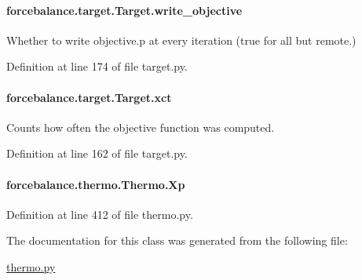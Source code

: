 \hypertarget{classforcebalance_1_1target_1_1Target_a7a95624dfe03f0cee0e5f1ae09db306a}{
\paragraph[{write\-\_\-objective}]{\setlength{\rightskip}{0pt plus 5cm}forcebalance.\-target.\-Target.\-write\-\_\-objective\hspace{0.3cm}{\ttfamily [inherited]}}}\label{classforcebalance_1_1target_1_1Target_a7a95624dfe03f0cee0e5f1ae09db306a}


Whether to write objective.\-p at every iteration (true for all but remote.) 



Definition at line 174 of file target.\-py.

\hypertarget{classforcebalance_1_1target_1_1Target_aad2e385cfbf7b4a68f1c2cb41133fe82}{
\paragraph[{xct}]{\setlength{\rightskip}{0pt plus 5cm}forcebalance.\-target.\-Target.\-xct\hspace{0.3cm}{\ttfamily [inherited]}}}\label{classforcebalance_1_1target_1_1Target_aad2e385cfbf7b4a68f1c2cb41133fe82}


Counts how often the objective function was computed. 



Definition at line 162 of file target.\-py.

\hypertarget{classforcebalance_1_1thermo_1_1Thermo_a5d5c7cfd9aa3bbd85ff15cb476ba990b}{
\paragraph[{Xp}]{\setlength{\rightskip}{0pt plus 5cm}forcebalance.\-thermo.\-Thermo.\-Xp}}\label{classforcebalance_1_1thermo_1_1Thermo_a5d5c7cfd9aa3bbd85ff15cb476ba990b}


Definition at line 412 of file thermo.\-py.



The documentation for this class was generated from the following file\-:\begin{DoxyCompactItemize}
\item 
\hyperlink{thermo_8py}{thermo.\-py}\end{DoxyCompactItemize}
